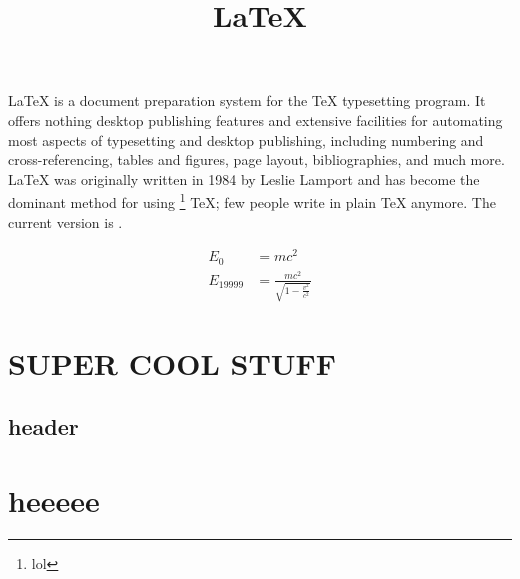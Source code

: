 \documentclass[12pt]{article}
\title{\LaTeX}
\date{}
\begin{document}
	\maketitle
	\LaTeX{} is a document preparation system for the \TeX{}
	typesetting program. It offers nothing desktop
	publishing features and extensive facilities for
	automating most aspects of typesetting and desktop
	publishing, including numbering and cross-referencing,
	tables and figures, page layout, bibliographies, and
	much more. \LaTeX{} was originally written in 1984 by
	Leslie Lamport and has become the dominant method for
	using \thanks{lol} \TeX; few people write in plain \TeX{} anymore.
	The current version is \LaTeXe.
	
	\begin{align}
		E_0 &= mc^2                              \\
		E_{19999} &= \frac{mc^2}{\sqrt{1-\frac{v^2}{c^2}}}
	\end{align}
	\section[nothing cool]{SUPER COOL STUFF}
	\subsection{header}
	\section[meh]{heeeee}
\end{document}
